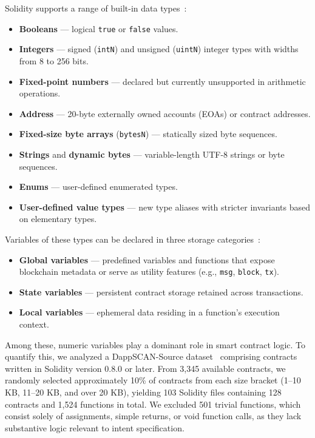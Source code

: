 \documentclass[pdflatex,sn-basic]{sn-jnl}%
\theoremstyle{thmstyleone}%
\theoremstyle{thmstyletwo}%
\theoremstyle{thmstylethree}%
\begin{document}
Solidity supports a range of built-in data types~\citep{soltype}:
\begin{itemize}
    \item \textbf{Booleans} — logical \texttt{true} or \texttt{false} values.
    \item \textbf{Integers} — signed (\texttt{intN}) and unsigned (\texttt{uintN}) integer types with widths from 8 to 256 bits.
    \item \textbf{Fixed-point numbers} — declared but currently unsupported in arithmetic operations.
    \item \textbf{Address} — 20-byte externally owned accounts (EOAs) or contract addresses.
    \item \textbf{Fixed-size byte arrays} (\texttt{bytesN}) — statically sized byte sequences.
    \item \textbf{Strings} and \textbf{dynamic bytes} — variable-length UTF-8 strings or byte sequences.
    \item \textbf{Enums} — user-defined enumerated types.
    \item \textbf{User-defined value types} — new type aliases with stricter invariants based on elementary types.
\end{itemize}

Variables of these types can be declared in three storage categories~\citep{solgvar, solsvar}:
\begin{itemize}
    \item \textbf{Global variables} — predefined variables and functions that expose blockchain metadata or serve as utility features (e.g., \texttt{msg}, \texttt{block}, \texttt{tx}).
    \item \textbf{State variables} — persistent contract storage retained across transactions.
    \item \textbf{Local variables} — ephemeral data residing in a function’s execution context.
\end{itemize}

Among these, numeric variables play a dominant role in smart contract logic. To quantify this, we analyzed a DappSCAN-Source dataset~\citep{dappscan} comprising contracts written in Solidity version 0.8.0 or later. From 3,345 available contracts, we randomly selected approximately 10\% of contracts from each size bracket (1–10 KB, 11–20 KB, and over 20 KB), yielding 103 Solidity files containing 128 contracts and 1,524 functions in total. We excluded 501 trivial functions, which consist solely of assignments, simple returns, or void function calls, as they lack substantive logic relevant to intent specification. 
\end{document}
